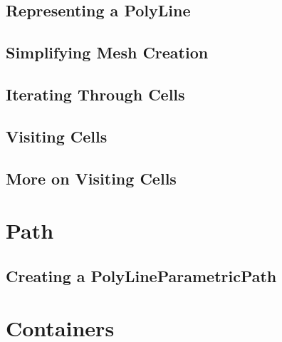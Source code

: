 %


\subsection{Representing a PolyLine}
\label{sec:MeshPolyLine}

%


\subsection{Simplifying Mesh Creation}
\label{sec:AutomaticMesh}

%


\subsection{Iterating Through Cells}
\label{sec:MeshCellsIteration}

%


\subsection{Visiting Cells}
\label{sec:MeshCellVisitor}

%


\subsection{More on Visiting Cells}
\label{sec:MeshCellVisitorMultipleType}

%




\section{Path}\label{PathSection}

\subsection{Creating a PolyLineParametricPath}
\label{sec:CreatingAPolyLineParametricPath}

%

\section{Containers}\label{ContainersSection}
\label{sec:TreeContainer}
%



